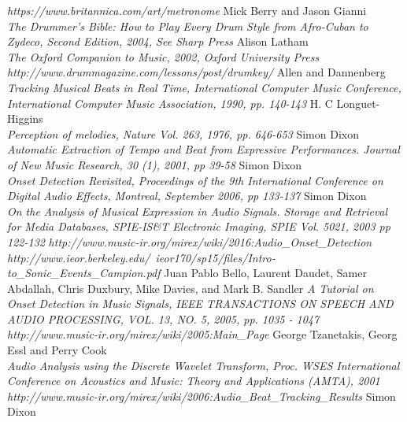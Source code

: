 \documentclass[a4paper, 11pt]{article}
\begin{document}
\newpage
\begin{thebibliography}{99}
\textit{https://www.britannica.com/art/metronome}
Mick Berry and Jason Gianni\\
\textit{The Drummer's Bible: How to Play Every Drum Style from Afro-Cuban to Zydeco, Second Edition, 2004, See Sharp Press}
Alison Latham\\
\textit{The Oxford Companion to Music, 2002, Oxford University Press}
\textit{http://www.drummagazine.com/lessons/post/drumkey/}
Allen and Dannenberg\\
\textit{Tracking Musical Beats in Real Time, International Computer Music Conference, International Computer Music Association, 1990, pp. 140-143}
H. C Longuet-Higgins\\
\textit{Perception of melodies, Nature Vol. 263, 1976, pp. 646-653}
Simon Dixon\\
\textit{Automatic Extraction of Tempo and Beat from Expressive Performances. Journal of New Music Research, 30 (1), 2001, pp 39-58}
Simon Dixon\\
\textit{Onset Detection Revisited, Proceedings of the 9th International Conference on Digital Audio Effects, Montreal, September 2006, pp 133-137}
Simon Dixon\\
\textit{On the Analysis of Musical Expression in Audio Signals. Storage and Retrieval for Media Databases, SPIE-IS\&T Electronic Imaging, SPIE Vol. 5021, 2003 pp 122-132}
\textit{http://www.music-ir.org/mirex/wiki/2016:Audio\_Onset\_Detection}
\textit{http://www.ieor.berkeley.edu/~ieor170/sp15/files/Intro-to\_Sonic\_Events\_Campion.pdf}
Juan Pablo Bello, Laurent Daudet, Samer Abdallah, Chris Duxbury, Mike Davies, and Mark B. Sandler 
\textit{A Tutorial on Onset Detection in Music Signals, IEEE TRANSACTIONS ON SPEECH AND AUDIO PROCESSING, VOL. 13, NO. 5, 2005, pp. 1035 - 1047}
\textit{http://www.music-ir.org/mirex/wiki/2005:Main\_Page}
George Tzanetakis, Georg Essl and Perry Cook\\
\textit{Audio Analysis using the Discrete Wavelet Transform, Proc. WSES International Conference on Acoustics and Music: Theory and Applications (AMTA), 2001}
\textit{http://www.music-ir.org/mirex/wiki/2006:Audio\_Beat\_Tracking\_Results}
Simon Dixon\\

\end{thebibliography}
\end{document}
